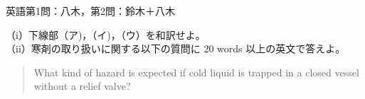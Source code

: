 \documentclass[fleqn]{jbook}
\begin{document}
\begin{question}{英語}{第1問：八木，第2問：鈴木＋八木}

（i）下線部（ア)，（イ)，（ウ）を和訳せよ。\\

（ii）寒剤の取り扱いに関する以下の質問に 20 words 以上の英文で答えよ。
\begin{quote}
What kind of hazard is expected if cold liquid is trapped in a closed vessel 
without a relief valve?
\end{quote}

\end{question}


\end{document}
